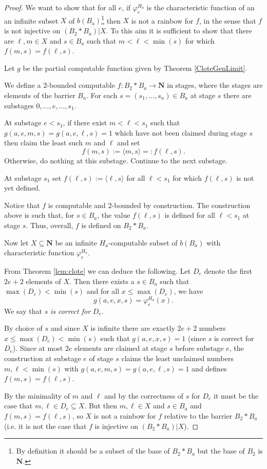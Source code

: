 \documentclass{amsart}
\theoremstyle{plain}
\theoremstyle{plain}
\newcommand\Nat{\mathbf{N}}
\begin{document}
\begin{proof}
We want to show that for all $e$, if $\varphi_e^{H_a}$ is the characteristic function of an an infinite subset $X$ of $b(B_a)$\footnote{ By definition it should be a subset of the base of $B_2 * B_a$ but the base of $B_2$ is $\Nat$.}
then $X$ is not a rainbow for $f$, in the sense that $f$ is not injective on $(B_2*B_a)\vert X$. 
To this aim it is sufficient to show that there are $\ell,m \in X$ and $s \in B_a$ such that $m < \ell < \min(s)$ for which $f(m, s) = f(\ell, s)$. 

Let $g$ be the partial computable function given by Theorem \ref{CloteGenLimit}.

We define a $2$-bounded computable $f:B_2 * B_a \to \Nat$ in stages, where the stages are elements of the barrier $B_a$. For each $s= (s_1,\dots, s_n)\in B_a$ 
at stage $s$ there are substages $0, \dots, e, \dots, s_1$. 

At substage $e < s_1$, if there exist $m < \ell < s_1$ such that $g(a,e,m,s) = g(a,e,\ell,s)=1$ which have not been claimed during stage $s$ then claim the least such $m$ and $\ell$ and set
$$ f(m,s) := \langle m, s\rangle =: f(\ell,s).$$ 
Otherwise, do nothing at this substage. Continue to the next substage.

At substage $s_1$ set $f(\ell,s) := \langle \ell, s\rangle$ for all $\ell < s_1$ for which $f(\ell,s)$ is not yet defined.

Notice that $f$ is computable and $2$-bounded by construction. The construction above is such that, for $s\in B_a$, the value $f(\ell,s)$ is defined
for all $\ell < s_1$ at stage $s$. Thus, overall, $f$ is defined on $B_2 * B_a$. 

Now let $X\subseteq\Nat$ be an infinite $H_a$-computable subset of $b(B_a)$ with characteristic function $\varphi_e^{H_a}$. 

From Theorem \ref{lem:clote} we can deduce the following.
Let $D_e$ denote the first $2e+2$ elements of $X$. 
Then there exists a $s \in B_a$ such that $\max(D_e) < \min(s)$ and for all $x \leq \max(D_e)$, we have 
$$ g(a,e,x,s) = \varphi_e^{H_a}(x).$$
We say that $s$ {\em is correct for} $D_e$.

By choice of $s$ and since $X$ is infinite there are exactly $2e+2$ numbers $x\leq \max(D_e) < \min(s)$ 
such that $g(a,e,x,s)=1$ (since $s$ is correct for $D_e$). Since at most $2e$ elements 
are claimed at stage $s$ before substage $e$, the construction at substage $e$ of stage $s$
claims the least unclaimed numbers $m, \ell < \min(s)$ with $g(a,e,m,s)= g(a,e,\ell,s)=1$ and defines $f(m,s) = f(\ell,s)$. 

By the minimality of $m$ and $\ell$ and by the correctness of $s$ for $D_e$
it must be the case that $m, \ell \in D_e \subseteq X$. 
But then $m, \ell \in X$ and $s \in B_a$ and $f(m,s)=f(\ell,s)$, 
so $X$ is not a rainbow for $f$ relative to the barrier $B_2*B_a$ (i.e. it is not the case that $f$ is injective on $(B_2*B_a)\vert X$).
\end{proof}
\end{document}
